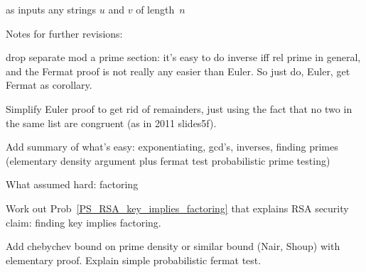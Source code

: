 as inputs any strings $u$ and $v$ of length~$n$
\fi


\begin{problems}

\classproblems
{}
\end{problems}


\begin{editingnotes}
Notes for further revisions:

drop separate mod a prime section: it's easy to do inverse iff rel
prime in general, and the Fermat proof is not really any easier than
Euler. So just do, Euler, get Fermat as corollary.

Simplify Euler proof to get rid of remainders, just using the fact
that no two in the same list are congruent (as in 2011 slides5f).

Add summary of what's easy: exponentiating, gcd's, inverses, finding
primes (elementary density argument plus fermat test probabilistic
prime testing)

What assumed hard: factoring

Work out Prob~\ref{PS_RSA_key_implies_factoring} that explains RSA security
claim: finding key implies factoring.

Add chebychev bound on prime density or similar bound (Nair, Shoup) with
elementary proof.  Explain simple probabilistic fermat test.
\end{editingnotes}

\endinput
